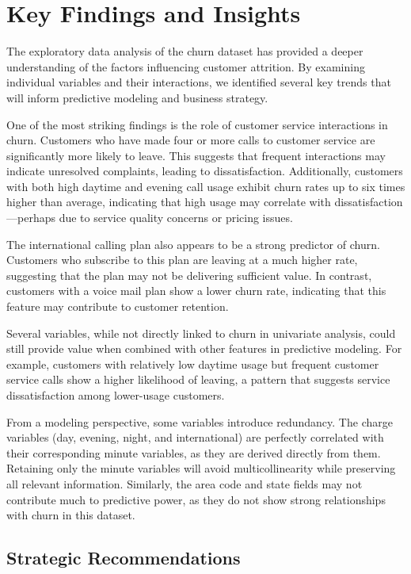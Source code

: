 \documentclass[
  11pt,
]{book}
\theoremstyle{definition}
\theoremstyle{definition}
\theoremstyle{definition}
\theoremstyle{definition}
\theoremstyle{remark}
\begin{document}
\section{Key Findings and Insights}\label{key-findings-and-insights}

The exploratory data analysis of the churn dataset has provided a deeper understanding of the factors influencing customer attrition. By examining individual variables and their interactions, we identified several key trends that will inform predictive modeling and business strategy.

One of the most striking findings is the role of customer service interactions in churn. Customers who have made four or more calls to customer service are significantly more likely to leave. This suggests that frequent interactions may indicate unresolved complaints, leading to dissatisfaction. Additionally, customers with both high daytime and evening call usage exhibit churn rates up to six times higher than average, indicating that high usage may correlate with dissatisfaction---perhaps due to service quality concerns or pricing issues.

The international calling plan also appears to be a strong predictor of churn. Customers who subscribe to this plan are leaving at a much higher rate, suggesting that the plan may not be delivering sufficient value. In contrast, customers with a voice mail plan show a lower churn rate, indicating that this feature may contribute to customer retention.

Several variables, while not directly linked to churn in univariate analysis, could still provide value when combined with other features in predictive modeling. For example, customers with relatively low daytime usage but frequent customer service calls show a higher likelihood of leaving, a pattern that suggests service dissatisfaction among lower-usage customers.

From a modeling perspective, some variables introduce redundancy. The charge variables (day, evening, night, and international) are perfectly correlated with their corresponding minute variables, as they are derived directly from them. Retaining only the minute variables will avoid multicollinearity while preserving all relevant information. Similarly, the area code and state fields may not contribute much to predictive power, as they do not show strong relationships with churn in this dataset.

\subsection*{Strategic Recommendations}\label{strategic-recommendations}
\end{document}
